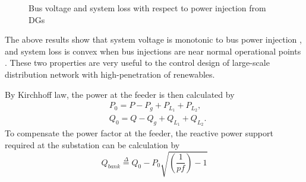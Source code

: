 \documentclass{article}
\begin{document}
\begin{figure}[h]
\centering
\quad
    \caption{Bus voltage and system loss with respect to power injection from DGs} 
    \label{fig:phsor_diagram}
\end{figure}


The above results show that system voltage is monotonic to bus power injection \cite{miu2000existence}, and system loss is convex when bus injections are near normal operational points \cite{gan2016online}. These two properties are very useful to the control design of large-scale distribution network with high-penetration of renewables.

By Kirchhoff law, the power at the feeder is then calculated by
\begin{align*}
&P_0 = P-P_{g}+P_{L_1}+P_{L_2},\\
&Q_0 = Q-Q_{g}+Q_{L_1}+Q_{L_2}.
\end{align*}
To compensate the power factor at the feeder, the reactive power support required at the substation can be calculation by
\begin{equation}
    Q_{bank} \overset{\Delta}{=} Q_0 - P_0\sqrt{\left(\frac{1}{pf}\right)-1}
\end{equation}
\end{document}
